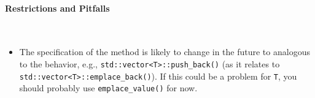\paragraph{Restrictions and Pitfalls}\mbox{}\\
\begin{itemize}
  \item The specification of the method is likely to change in the future to
  analogous to the behavior, e.g., \texttt{std::vector<T>::push\_back()} (as it
  relates to \texttt{std::vector<T>::emplace\_back()}).  If this could be a
  problem for \texttt{T}, you should probably use \texttt{emplace\_value()} for now.
\end{itemize}




